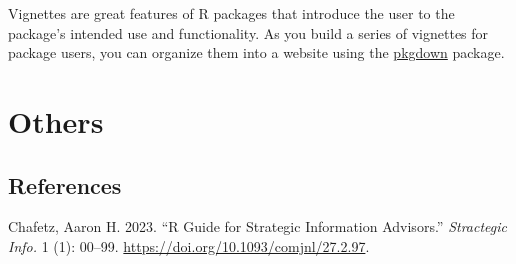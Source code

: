 \documentclass[
  letterpaper,
  DIV=11,
  numbers=noendperiod]{scrreprt}
\newlength{\cslhangindent}
\newlength{\cslentryspacingunit} %
\newenvironment{CSLReferences}[2] %
 {%
  \setlength{\parindent}{0pt}
  \ifodd #1
  \let\oldpar\par
  \def\par{\hangindent=\cslhangindent\oldpar}
  \fi
  \setlength{\parskip}{#2\cslentryspacingunit}
 }%
 {}
\begin{document}
Vignettes are great features of R packages that introduce the user to
the package's intended use and functionality. As you build a series of
vignettes for package users, you can organize them into a website using
the \href{https://pkgdown.r-lib.org/}{pkgdown} package.

\part{Others}

\hypertarget{references}{%
\chapter*{References}\label{references}}


\hypertarget{refs}{}
\begin{CSLReferences}{1}{0}
\leavevmode{}%
Chafetz, Aaron H. 2023. {``R Guide for Strategic Information
Advisors.''} \emph{Stractegic Info.} 1 (1): 00--99.
\url{https://doi.org/10.1093/comjnl/27.2.97}.

\end{CSLReferences}
\end{document}
